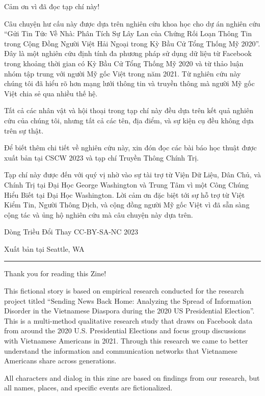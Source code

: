 \documentclass[
]{book}
\begin{document}
Cảm ơn vì đã đọc tạp chí này!

Câu chuyện hư cấu này được dựa trên nghiên cứu khoa học cho dự án nghiên cứu ``Gửi Tin Tức Về Nhà: Phân Tích Sự Lây Lan của Chứng Rối Loạn Thông Tin trong Cộng Đồng Người Việt Hải Ngoại trong Kỳ Bầu Cử Tổng Thống Mỹ 2020''. Đây là một nghiên cứu định tính đa phương pháp sử dụng dữ liệu từ Facebook trong khoảng thời gian có Kỳ Bầu Cử Tổng Thống Mỹ 2020 và từ thảo luận nhóm tập trung với người Mỹ gốc Việt trong năm 2021. Từ nghiên cứu này chúng tôi đã hiểu rõ hơn mạng lưới thông tin và truyền thông mà người Mỹ gốc Việt chia sẻ qua nhiều thế hệ.

Tất cả các nhân vật và hội thoại trong tạp chí này đều dựa trên kết quả nghiên cứu của chúng tôi, nhưng tất cả các tên, địa điểm, và sự kiện cụ đều không dựa trên sự thật.

Để biết thêm chi tiết về nghiên cứu này, xin đón đọc các bài báo học thuật được xuất bản tại CSCW 2023 và tạp chí Truyền Thông Chính Trị.

Tạp chí này được đến với quý vị nhờ vào sự tài trợ từ Viện Dữ Liệu, Dân Chủ, và Chính Trị tại Đại Học George Washington và Trung Tâm vì một Công Chúng Hiểu Biết tại Đại Học Washington. Lời cảm ơn đặc biệt tới sự hỗ trợ từ Việt Kiểm Tin, Người Thông Dịch, và cộng đồng người Mỹ gốc Việt vì đã sẵn sàng cộng tác và ủng hộ nghiên cứu mà câu chuyện này dựa trên.

Dòng Triều Đổi Thay CC-BY-SA-NC 2023

Xuất bản tại Seattle, WA

\begin{center}\rule{0.5\linewidth}{0.5pt}\end{center}

Thank you for reading this Zine!

This fictional story is based on empirical research conducted for the research project titled ``Sending News Back Home: Analyzing the Spread of Information Disorder in the Vietnamese Diaspora during the 2020 US Presidential Election''. This is a multi-method qualitative research study that draws on Facebook data from around the 2020 U.S. Presidential Elections and focus group discussions with Vietnamese Americans in 2021. Through this research we came to better understand the information and communication networks that Vietnamese Americans share across generations.

All characters and dialog in this zine are based on findings from our research, but all names, places, and specific events are fictionalized.
\end{document}
